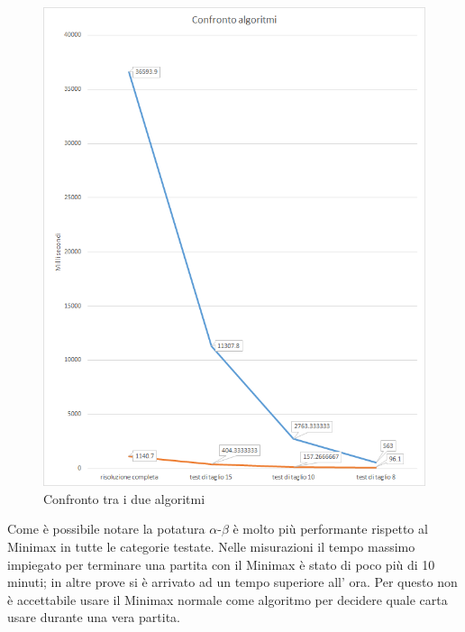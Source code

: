 	\begin{figure}[h!]
		\centering
		\includegraphics[scale=0.8]{grafico3.png}
		\caption{Confronto tra i due algoritmi}
		\label{fig6}
	\end{figure}

	\newpage
	Come è possibile notare la potatura $\alpha$-$\beta$ è molto più performante rispetto al Minimax in tutte le categorie testate. Nelle misurazioni il tempo massimo impiegato per terminare una partita con il Minimax è stato di poco più di 10 minuti; in altre prove si è arrivato ad un tempo superiore all' ora. Per questo non è accettabile usare il Minimax normale come algoritmo per decidere quale carta usare durante una vera partita.

